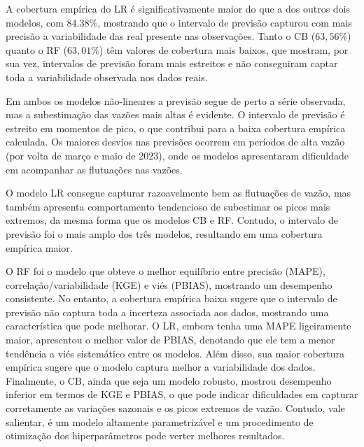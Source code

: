 A cobertura empírica do LR é significativamente maior do que a dos outros dois modelos, com $84.38\%$, mostrando que o intervalo de previsão capturou com mais precisão a variabilidade das real presente nas observações. Tanto o CB ($63,56\%$) quanto o RF ($63,01\%$) têm valores de cobertura mais baixos, que mostram, por sua vez, intervalos de previsão foram mais estreitos e não conseguiram captar toda a variabilidade observada nos dados reais.

Em ambos os modelos não-lineares a previsão segue de perto a série observada, mas a subestimação das vazões mais altas é evidente. O intervalo de previsão é estreito em momentos de pico, o que contribui para a baixa cobertura empírica calculada. Os maiores desvios nas previsões ocorrem em períodos de alta vazão (por volta de março e maio de 2023), onde os modelos apresentaram dificuldade em acompanhar as flutuações nas vazões.

O modelo LR consegue capturar razoavelmente bem as flutuações de vazão, mas também apresenta comportamento tendencioso de subestimar os picos mais extremos, da mesma forma que os modelos CB e RF. Contudo, o intervalo de previsão foi o mais amplo dos três modelos, resultando em uma cobertura empírica maior.

O RF foi o modelo que obteve o melhor equilíbrio entre precisão (MAPE), correlação/variabilidade (KGE) e viés (PBIAS), mostrando um desempenho consistente. No entanto, a cobertura empírica baixa sugere que o intervalo de previsão não captura toda a incerteza associada aos dados, mostrando uma característica que pode melhorar. O LR, embora tenha uma MAPE ligeiramente maior, apresentou o melhor valor de PBIAS, denotando que ele tem a menor tendência a viés sistemático entre os modelos. Além disso, sua maior cobertura empírica sugere que o modelo captura melhor a variabilidade dos dados. Finalmente, o CB, ainda que seja um modelo robusto, mostrou desempenho inferior em termos de KGE e PBIAS, o que pode indicar dificuldades em capturar corretamente as variações sazonais e os picos extremos de vazão. Contudo, vale salientar, é um modelo altamente parametrizável e um procedimento de otimização dos hiperparâmetros pode verter melhores resultados.

